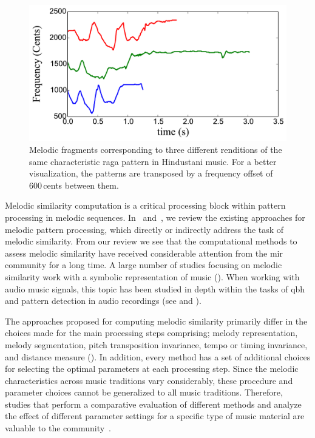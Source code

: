 \begin{figure}
	\begin{center}
		\includegraphics[width=\figSizeEighty]{ch06_patterns/figures/SimilarityEvaluation/Hindustani3Patts.pdf}
	\end{center}
	\caption{Melodic fragments corresponding to three different renditions of the same characteristic \gls{raga} pattern in Hindustani music. For a better visualization, the patterns are transposed by a frequency offset of 600\,cents between them.}
	\label{fig:examples_3_phrases}
\end{figure}

Melodic similarity computation is a critical processing block within pattern processing in melodic sequences. In~ and~, we review the existing approaches for melodic pattern processing, which directly or indirectly address the task of melodic similarity. From our review we see that the computational methods to assess melodic similarity have received considerable attention from the \gls{mir} community for a long time. A large number of studies focusing on melodic similarity work with a symbolic representation of music (). When working with audio music signals, this topic has been studied in depth within the tasks of \acrfull{qbh} and pattern detection in audio recordings (see  and ).

The approaches proposed for computing melodic similarity primarily differ in the choices made for the main processing steps comprising; melody representation, melody segmentation, pitch transposition invariance, tempo or timing invariance, and distance measure (). In addition, every method has a  set of additional choices for selecting the optimal parameters at each processing step. Since the melodic characteristics across music traditions vary considerably, these procedure and parameter choices cannot be generalized to all music traditions. Therefore, studies that perform a comparative evaluation of different methods and analyze the effect of different parameter settings for a specific type of music material are valuable to the community~\citep{RBDannenberg2007QBH,Rao2014,XavierSerra2011}.


